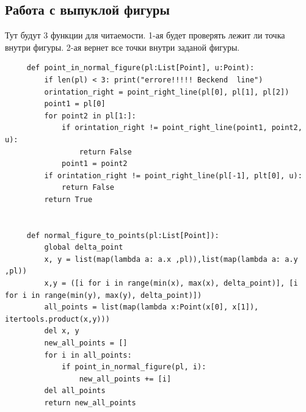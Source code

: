 \documentclass[12pt]{article} %
\begin{document}
 	 \subsection{Работа с выпуклой фигуры}
 	 \hspace*{1cm}Тут будут 3 функции для читаемости. 1-ая будет проверять лежит ли точка внутри фигуры. 2-ая вернет все точки внутри заданой фигуры. 
 	 \begin{verbatim}
 	 def point_in_normal_figure(pl:List[Point], u:Point):
 	     if len(pl) < 3: print("errore!!!!! Beckend  line")
 	     orintation_right = point_right_line(pl[0], pl[1], pl[2])
 	     point1 = pl[0]
 	     for point2 in pl[1:]:
 	         if orintation_right != point_right_line(point1, point2, u):
 	             return False
 	         point1 = point2
 	     if orintation_right != point_right_line(pl[-1], plt[0], u):
 	         return False
 	     return True
 	 
 	 
 	 def normal_figure_to_points(pl:List[Point]):
 	     global delta_point
 	     x, y = list(map(lambda a: a.x ,pl)),list(map(lambda a: a.y ,pl))
 	     x,y = ([i for i in range(min(x), max(x), delta_point)], [i for i in range(min(y), max(y), delta_point)])
 	     all_points = list(map(lambda x:Point(x[0], x[1]), itertools.product(x,y)))
 	     del x, y
 	     new_all_points = []
 	     for i in all_points:
 	         if point_in_normal_figure(pl, i):
 	             new_all_points += [i]
 	     del all_points
 	     return new_all_points
 	 \end{verbatim}
\end{document}
